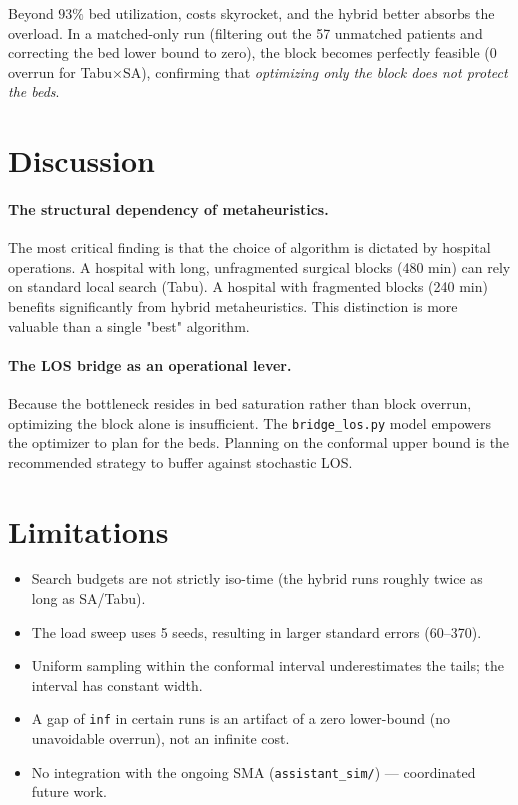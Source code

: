 \documentclass[11pt,a4paper]{article}
\begin{document}
Beyond \(93\%\) bed utilization, costs skyrocket, and the hybrid better absorbs the overload. In a matched-only run (filtering out the 57 unmatched patients and correcting the bed lower bound to zero), the block becomes perfectly feasible (0 overrun for Tabu\(\times\)SA), confirming that \emph{optimizing only the block does not protect the beds}. 

\section{Discussion}

\paragraph{The structural dependency of metaheuristics.}
The most critical finding is that the choice of algorithm is dictated by hospital operations. A hospital with long, unfragmented surgical blocks (480 min) can rely on standard local search (Tabu). A hospital with fragmented blocks (240 min) benefits significantly from hybrid metaheuristics. This distinction is more valuable than a single "best" algorithm.

\paragraph{The LOS bridge as an operational lever.}
Because the bottleneck resides in bed saturation rather than block overrun, optimizing the block alone is insufficient. The \texttt{bridge\_los.py} model empowers the optimizer to plan for the beds. Planning on the conformal upper bound is the recommended strategy to buffer against stochastic LOS.

\section{Limitations}
\begin{itemize}[nosep]
  \item Search budgets are not strictly iso-time (the hybrid runs roughly twice as long as SA/Tabu).
  \item The load sweep uses 5 seeds, resulting in larger standard errors (60--370).
  \item Uniform sampling within the conformal interval underestimates the tails; the interval has constant width.
  \item A gap of \texttt{inf} in certain runs is an artifact of a zero lower-bound (no unavoidable overrun), not an infinite cost.
  \item No integration with the ongoing SMA (\texttt{assistant\_sim/}) --- coordinated future work.
\end{itemize}
\end{document}
